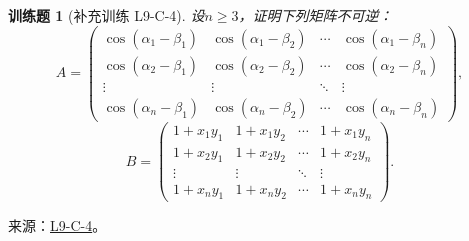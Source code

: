 \documentclass[12pt,fontset=fandol]{ctexart}
\newtheorem{exercise}{训练题}[section]
\begin{document}
\begin{exercise}[补充训练 L9-C-4]\label{prob:L9-C-4}
设$n\geqslant 3$，证明下列矩阵不可逆：
        \[A=\begin{pmatrix}
                \cos(\alpha_1-\beta_1) & \cos(\alpha_1-\beta_2) & \cdots & \cos(\alpha_1-\beta_n) \\
                \cos(\alpha_2-\beta_1) & \cos(\alpha_2-\beta_2) & \cdots & \cos(\alpha_2-\beta_n) \\
                \vdots                 & \vdots                 & \ddots & \vdots                 \\
                \cos(\alpha_n-\beta_1) & \cos(\alpha_n-\beta_2) & \cdots & \cos(\alpha_n-\beta_n)
            \end{pmatrix},\]
        \[B=\begin{pmatrix}
                1+x_1y_1 & 1+x_1y_2 & \cdots & 1+x_1y_n \\
                1+x_2y_1 & 1+x_2y_2 & \cdots & 1+x_2y_n \\
                \vdots   & \vdots   & \ddots & \vdots   \\
                1+x_ny_1 & 1+x_ny_2 & \cdots & 1+x_ny_n
            \end{pmatrix}.\]
\end{exercise}
\noindent 来源：\href{https://github.com/yhwu-is/Linear-Algebra-Left-Undone/blob/new/%E8%AE%B2%E4%B9%89/%E4%B8%93%E9%A2%98/9%20%E7%9F%A9%E9%98%B5%E8%BF%90%E7%AE%97%E8%BF%9B%E9%98%B6.tex}{L9-C-4}。
\end{document}

